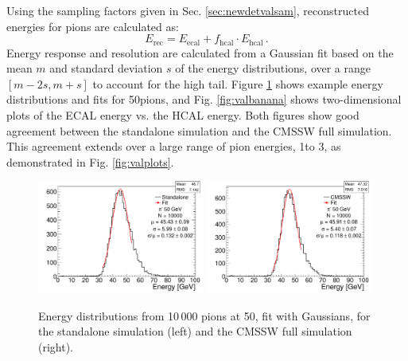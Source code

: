Using the sampling factors given in Sec. \ref{sec:newdetvalsam}, reconstructed energies for pions are calculated as:
\begin{equation} \label{Erec} E_{\text{rec}} = E_{\text{ecal}} + f_{\text{hcal}} \cdot E_{\text{hcal}}\,. \end{equation}
Energy response and resolution are calculated from a Gaussian fit based on the mean $m$ and standard deviation $s$ of the energy distributions, over a range $[m-2s, m+s]$ to account for the high tail. Figure \ref{fig:valfits} shows example energy distributions and fits for 50\GeV pions, and Fig. \ref{fig:valbanana} shows two-dimensional plots of the ECAL energy vs. the HCAL energy. Both figures show good agreement between the standalone simulation and the CMSSW full simulation. This agreement extends over a large range of pion energies, 1\GeV to 3\TeV, as demonstrated in Fig. \ref{fig:valplots}.

\begin{figure}[hbtp]
\begin{center}
\includegraphics[width=0.49\textwidth]{figures/g4_hcal_tot_res_fit_50gev.pdf}
\includegraphics[width=0.49\textwidth]{figures/fs_hcal_tot_res_fit_50gev.pdf}
\caption{Energy distributions from 10\,000 pions at 50\GeV, fit with Gaussians, for the standalone simulation (left) and the CMSSW full simulation (right).}
\label{fig:valfits}
\end{center}
\end{figure}

